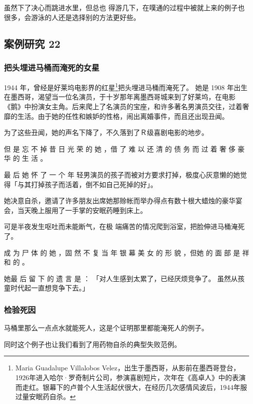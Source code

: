 \documentclass[UTF8]{ctexart}
\begin{document}
虽然下了决心而跳进水里，但总也 得游几下，在噗通的过程中被就上来的例子也很多，会游泳的人还是选择别的方法更好些。





\subsection{案例研究 22}

\subsubsection*{把头埋进马桶而淹死的女星}

1944 年，曾经是好莱坞电影界的红星\footnote{Maria Guadalupe Villalobos Velez，出生于墨西哥，从影前在墨西哥登台，1926年进入哈尔·罗奇制片公司，参演喜剧短片，次年在《高卓人》中的表演而走红。银幕下的卢普个人生活起伏很大，在经历几次感情风波后，1944年服过量安眠药自杀。}把头埋进马桶而淹死了。
她是 1908 年出生在墨西哥，渴望当一位名演员，于十岁那年离墨西哥城来到了好莱坞，在电影《鹅》中扮演女主角。后来爬上了名演员的宝座，和许多著名男演员交往，过着奢靡的生活。由于她的任性和嫉妒的性格，闹出离婚事件，而且还出现丑闻。

为了这些丑闻，她的声名下降了，不久落到了Ｒ级喜剧电影的地步。

但 是 忘 不 掉 昔 日 光 荣 的 她 ，借 了 难 以 还 清 的 债 务 而 过 着 奢 侈 豪 华 的 生 活 。

最 后 她 怀 了 一 个 年 轻男演员的孩子而被对方要求打掉，极度心灰意懒的她觉得「与其打掉孩子而活着，倒不如自己死掉的好」。

她决意自杀，邀请了许多朋友出席她那赊帐而举办得点有数十根大蜡烛的豪华宴会，当天晚上服用了一手掌的安眠药睡到床上。

可是半夜发生呕吐而未能断气，在极 端痛苦的情况爬到浴室，把脸伸进马桶淹死了。

成 为 尸 体 的 她 ，固 然 不 复 当 年 银 幕 美 女 的 形 貌 ，但她 的 面 部 是 祥 和 的 。

她最 后 留 下 的 遗 言 是 ： 「对人生感到太累了，已经厌烦竞争了。
虽然从孩童时代起一直想竞争下去。」


\subsubsection*{检验死因}

马桶里那么一点点水就能死人，这是个证明那里都能淹死人的例子。

同时这个例子也让我们看到了用药物自杀的典型失败范例。 
\end{document}
